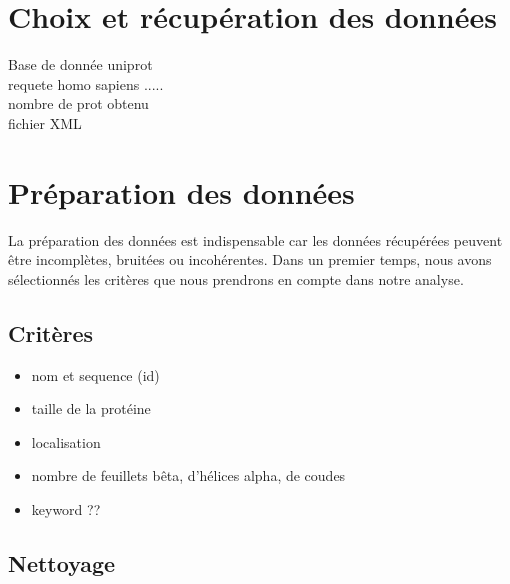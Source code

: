 \section*{Choix et récupération des données}

Base de donnée uniprot\\ requete homo sapiens .....\\
nombre de prot obtenu \\
fichier XML 
\section*{Préparation des données}

La préparation des données est indispensable car les données récupérées peuvent être incomplètes, bruitées ou incohérentes. 
Dans un premier temps, nous avons sélectionnés les critères que nous prendrons en compte dans notre analyse.

\subsection*{Critères}
\begin{itemize}
\item nom et sequence (id)
\item taille de la protéine
\item localisation 
\item nombre de feuillets bêta, d'hélices alpha, de coudes
\item keyword ??
\end{itemize}

\subsection*{Nettoyage}